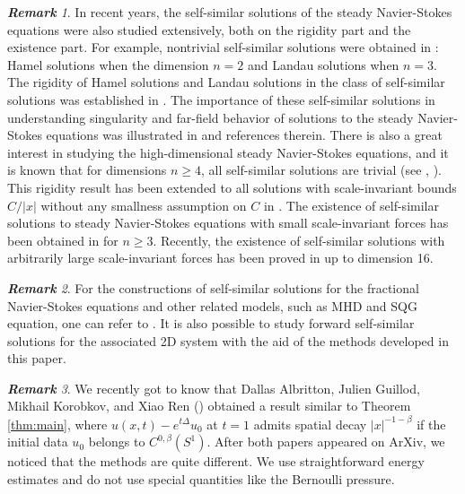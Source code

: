 \documentclass[12pt]{amsart}
\numberwithin{equation}{section}              %
\theoremstyle{remark}
\newtheorem{remark}{\bf Remark}[section]
\begin{document}
    \begin{remark}
 In recent years,   the  self-similar solutions of the steady Navier-Stokes equations  were also studied extensively, both on the rigidity part and the existence part. For example,  nontrivial self-similar solutions were obtained in  \cite{Hamel17, Jeffery01041915, Landau44}:
Hamel solutions when the dimension $n=2$ and Landau solutions when $n=3$. The rigidity of Hamel solutions and Landau solutions in the class of  self-similar solutions was established  in \cite{Tian98, Sverak11}.
    The importance of these self-similar solutions  in understanding singularity and far-field behavior of solutions to the steady Navier-Stokes equations was illustrated in \cite{MiuraTsai12, KorolevSverak11} and references therein. There is also a great interest in studying the high-dimensional steady Navier-Stokes equations, and 
    it is known that for  dimensions $n\geq 4$, all self-similar solutions are trivial (see \cite{Tsai98b}, \cite[Corollary in Section 2]{Sverak11}).
This rigidity result has been extended to all solutions with scale-invariant bounds $C/|x|$ without any smallness assumption on $C$ in \cite{bang2023rigidity}.
The existence of self-similar solutions to steady Navier-Stokes equations with small scale-invariant forces has been obtained in \cite{Kozono95, Phan13, Kaneko19, Tsurumi19} for  $n\geq 3$. Recently, the existence of self-similar solutions with arbitrarily large scale-invariant forces has been proved in \cite{Hao25} up to dimension 16.
\end{remark}


\begin{remark}
For the constructions of self-similar solutions for the fractional Navier-Stokes equations and other related models, such as MHD and SQG equation, one can refer to \cite{Lai19,  Lai24, Zhang19jmp, Yang26, Albritton22}. It is also possible to study forward self-similar solutions for the associated 2D system with the aid of the methods developed in this paper.
\end{remark}



    \begin{remark}
        We recently got to know that Dallas Albritton, Julien Guillod, Mikhail Korobkov, and Xiao Ren (\cite{AGKR}) obtained a result similar to Theorem \ref{thm:main}, where  $u(x,t)- e^{t\Delta}u_0$ at $t=1$ admits spatial decay $|x|^{-1-\beta}$ if the initial data $ u_0$ belongs to $ C^{0,\beta}(S^1)$. After both papers appeared on ArXiv,  we noticed that the methods are quite different. We use straightforward energy estimates and do not use special quantities like the Bernoulli pressure.
    \end{remark}
	
\end{document}
